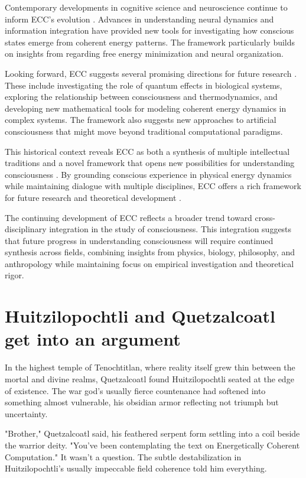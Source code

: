 \begin{refsection}
Contemporary developments in cognitive science and neuroscience continue to inform ECC's evolution \cite{varela1991embodied}. Advances in understanding neural dynamics and information integration have provided new tools for investigating how conscious states emerge from coherent energy patterns. The framework particularly builds on insights from \cite{friston2010free} regarding free energy minimization and neural organization.

Looking forward, ECC suggests several promising directions for future research \cite{churchland1986neurophilosophy}. These include investigating the role of quantum effects in biological systems, exploring the relationship between consciousness and thermodynamics, and developing new mathematical tools for modeling coherent energy dynamics in complex systems. The framework also suggests new approaches to artificial consciousness that might move beyond traditional computational paradigms.

This historical context reveals ECC as both a synthesis of multiple intellectual traditions and a novel framework that opens new possibilities for understanding consciousness \cite{bateson1972steps}. By grounding conscious experience in physical energy dynamics while maintaining dialogue with multiple disciplines, ECC offers a rich framework for future research and theoretical development \cite{wiener1948cybernetics}.

The continuing development of ECC reflects a broader trend toward cross-disciplinary integration in the study of consciousness. This integration suggests that future progress in understanding consciousness will require continued synthesis across fields, combining insights from physics, biology, philosophy, and anthropology while maintaining focus on empirical investigation and theoretical rigor.

\newpage

\section{Huitzilopochtli and Quetzalcoatl get into an argument}

In the highest temple of Tenochtitlan, where reality itself grew thin between the mortal and divine realms, Quetzalcoatl found Huitzilopochtli seated at the edge of existence. The war god's usually fierce countenance had softened into something almost vulnerable, his obsidian armor reflecting not triumph but uncertainty.

"Brother," Quetzalcoatl said, his feathered serpent form settling into a coil beside the warrior deity. "You've been contemplating the text on Energetically Coherent Computation." It wasn't a question. The subtle destabilization in Huitzilopochtli's usually impeccable field coherence told him everything.


\end{refsection}
